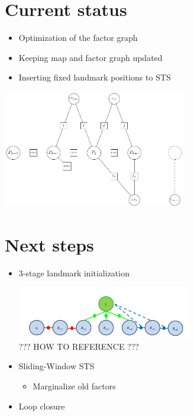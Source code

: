 \documentclass[%
    fourtothree=true, %
    DepLogo=true     %
    ]{ETHpres}
\begin{document}
		
		
\clearpage

\ETHslide
\section*{Current status}
\begin{itemize}
	\item[\ETHitem] Optimization of the factor graph
	\item[\ETHitem] Keeping map and factor graph updated
	\item[\ETHitem] Inserting fixed landmark positions to STS
\end{itemize}

\begin{center}
\includegraphics[width=0.6\textwidth]{TikZ_drawings/factor_graph_small/factor_graph.pdf}\\
\end{center}

\clearpage

\ETHslide
\section*{Next steps}
\begin{itemize}
	\item[\ETHitem] 3-stage landmark initialization
	\begin{center}
	\includegraphics[width=0.6\textwidth]{pictures/3stageLandmark.png}\\
	\footnotesize{??? HOW TO REFERENCE ???}
	\end{center}
 	\item[\ETHitem] Sliding-Window STS
	\begin{itemize}
		\item Marginalize old factors	
	\end{itemize} 
	\item[\ETHitem] Loop closure	
\end{itemize}

\clearpage

\end{document}
